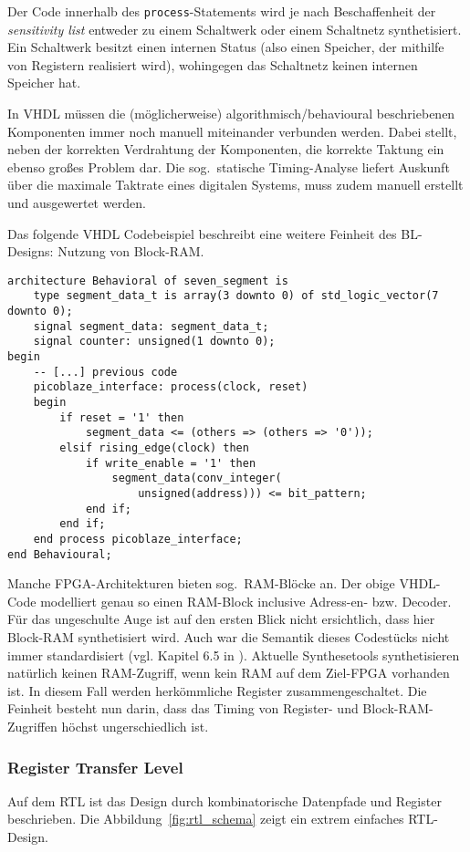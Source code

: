 \documentclass[oneside,a4paper]{article}
\def\VH#1{\lstinline[style=vhdl]{#1}}
\begin{document}
Der Code innerhalb des \VH{process}-Statements wird je nach
Beschaffenheit der \emph{sensitivity list} entweder zu einem
Schaltwerk oder einem Schaltnetz synthetisiert. Ein Schaltwerk
besitzt einen internen Status (also einen Speicher, der
mithilfe von Registern realisiert wird), wohingegen das Schaltnetz
keinen internen Speicher hat.

In VHDL müssen die (möglicherweise) algorithmisch/behavioural beschriebenen
Komponenten immer noch manuell miteinander verbunden werden. Dabei stellt,
neben der korrekten Verdrahtung der Komponenten, die korrekte Taktung ein
ebenso großes Problem dar. Die sog.\ statische Timing-Analyse liefert
Auskunft über die maximale Taktrate eines digitalen Systems, muss zudem
manuell erstellt und ausgewertet werden.

Das folgende VHDL Codebeispiel beschreibt eine weitere Feinheit des
BL-Designs: Nutzung von Block-RAM.

\begin{lstlisting}[style=vhdl,caption={RAM-Block in VHDL},label=ramblock]
architecture Behavioral of seven_segment is
    type segment_data_t is array(3 downto 0) of std_logic_vector(7 downto 0);
    signal segment_data: segment_data_t;
    signal counter: unsigned(1 downto 0);
begin
    -- [...] previous code
    picoblaze_interface: process(clock, reset)
    begin
        if reset = '1' then
            segment_data <= (others => (others => '0'));
        elsif rising_edge(clock) then
            if write_enable = '1' then
                segment_data(conv_integer(
                    unsigned(address))) <= bit_pattern;
            end if;
        end if;
    end process picoblaze_interface;
end Behavioural;
\end{lstlisting}

Manche FPGA-Architekturen bieten sog.\ RAM-Blöcke an.
Der obige VHDL-Code modelliert genau so einen
RAM-Block inclusive Adress-en- bzw. Decoder. Für das ungeschulte Auge
ist auf den ersten Blick nicht ersichtlich, dass hier Block-RAM
synthetisiert wird. Auch war die Semantik dieses Codestücks
nicht immer standardisiert (vgl. Kapitel 6.5 in \cite{IEEESYNTH}).
Aktuelle Synthesetools synthetisieren natürlich keinen RAM-Zugriff,
wenn kein RAM auf dem Ziel-FPGA vorhanden ist. In diesem Fall werden
herkömmliche Register zusammengeschaltet. Die Feinheit besteht nun
darin, dass das Timing von Register- und Block-RAM-Zugriffen höchst
ungerschiedlich ist.

\subsubsection{Register Transfer Level}
Auf dem RTL ist das Design durch kombinatorische Datenpfade und Register
beschrieben. Die Abbildung~\ref{fig:rtl_schema} zeigt ein extrem einfaches RTL-Design.
\end{document}
